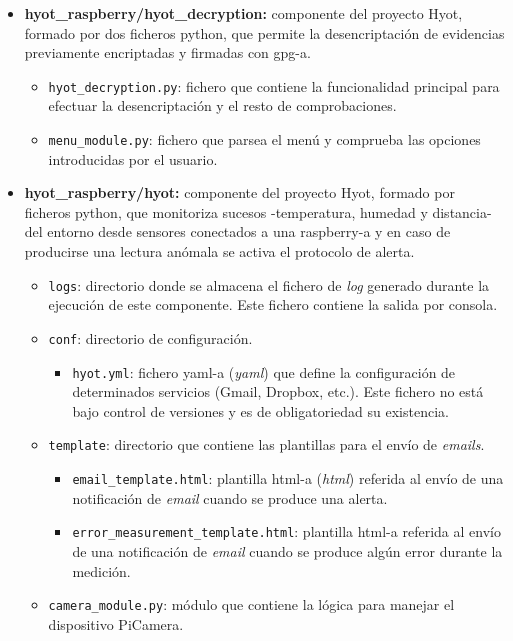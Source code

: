 \documentclass[12pt,a4paper, twoside]{report}
\begin{document}
\begin{itemize}
		\item \textbf{hyot\_raspberry/hyot\_decryption:} componente del proyecto Hyot, formado por dos ficheros \gls{python}, que permite la desencriptación de evidencias previamente encriptadas y firmadas con \gls{gpg-a}.
			\begin{itemize}
				\item \texttt{hyot\_decryption.py}: fichero que contiene la funcionalidad principal para efectuar la desencriptación y el resto de comprobaciones.
				\item \texttt{menu\_module.py}: fichero que parsea el menú y comprueba las opciones introducidas por el usuario.	
			\end{itemize}
		
		\item \textbf{hyot\_raspberry/hyot:} componente del proyecto Hyot, formado por ficheros \gls{python}, que monitoriza sucesos -temperatura, humedad y distancia- del entorno desde sensores conectados a una \gls{raspberry-a} y en caso de producirse una lectura anómala se activa el protocolo de alerta.
		\begin{itemize}
			\item \texttt{logs}: directorio donde se almacena el fichero de \textit{log} generado durante la ejecución de este componente. Este fichero contiene la salida por consola.
			\item \texttt{conf}: directorio de configuración.
			\begin{itemize}
				\item \texttt{hyot.yml}: fichero \gls{yaml-a} (\textit{\gls{yaml}}) que define la configuración de determinados servicios (Gmail, Dropbox, etc.). Este fichero no está bajo control de versiones y es de obligatoriedad su existencia.
			\end{itemize}
			\item \texttt{template}: directorio que contiene las plantillas para el envío de \textit{emails}.
			\begin{itemize}
				\item \texttt{email\_template.html}: plantilla \gls{html-a} (\textit{\gls{html}}) referida al envío de una notificación de \textit{email} cuando se produce una alerta.
				\item \texttt{error\_measurement\_template.html}: plantilla \gls{html-a} referida al envío de una notificación de \textit{email} cuando se produce algún error durante la medición.
			\end{itemize}
			\item \texttt{camera\_module.py}: módulo que contiene la lógica para manejar el dispositivo PiCamera.

\end{itemize}
\end{itemize}
\end{document}
